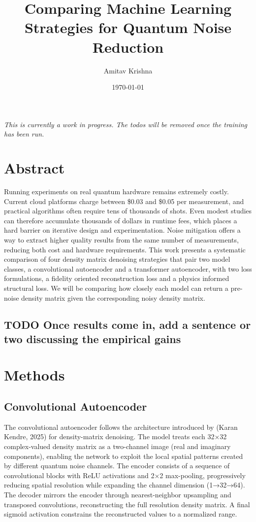 \documentclass[11pt]{article}
\author{Amitav Krishna}
\date{\today}
\title{Comparing Machine Learning Strategies for Quantum Noise Reduction}
\begin{document}
\maketitle
\emph{This is currently a work in progress. The todos will be removed once the training has been run.}
\section{Abstract}
\label{sec:org5420b63}
Running experiments on real quantum hardware remains extremely costly. Current cloud platforms charge between \$0.03 and \$0.05 per measurement, and practical algorithms often require tens of thousands of shots. Even modest studies can therefore accumulate thousands of dollars in runtime fees, which places a hard barrier on iterative design and experimentation. Noise mitigation offers a way to extract higher quality results from the same number of measurements, reducing both cost and hardware requirements. This work presents a systematic comparison of four density matrix denoising strategies that pair two model classes, a convolutional autoencoder and a transformer autoencoder, with two loss formulations, a fidelity oriented reconstruction loss and a physics informed structural loss. We will be comparing how closely each model can return a pre-noise density matrix given the corresponding noisy density matrix.
\subsection{{\bfseries\sffamily TODO} Once results come in, add a sentence or two discussing the empirical gains}
\label{sec:orgb96eda5}
\section{Methods}
\label{sec:org05208bb}
\subsection{Convolutional Autoencoder}
\label{sec:org7491b2c}
The convolutional autoencoder follows the architecture introduced by (Karan Kendre, 2025) for density-matrix denoising. The model treats each 32×32 complex-valued density matrix as a two-channel image (real and imaginary components), enabling the network to exploit the local spatial patterns created by different quantum noise channels. The encoder consists of a sequence of convolutional blocks with ReLU activations and 2×2 max-pooling, progressively reducing spatial resolution while expanding the channel dimension (1→32→64). The decoder mirrors the encoder through nearest-neighbor upsampling and transposed convolutions, reconstructing the full resolution density matrix. A final sigmoid activation constrains the reconstructed values to a normalized range.
\end{document}
